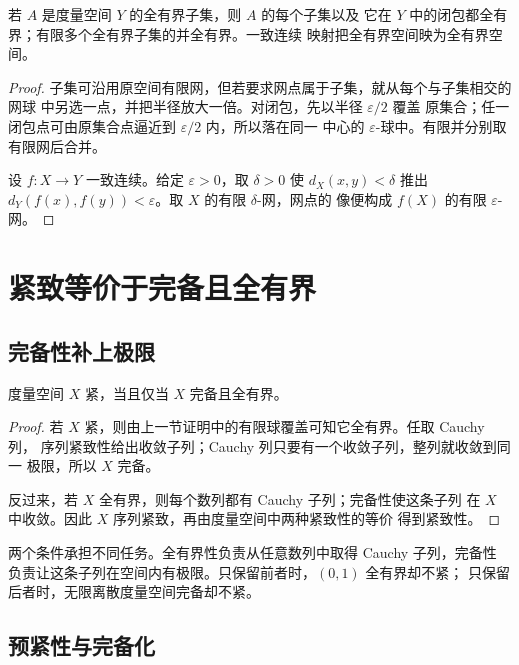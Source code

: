 \begin{proposition}[全有界性的保持]
\label{prop:total-bounded-preservation}
若 \(A\) 是度量空间 \(Y\) 的全有界子集，则 \(A\) 的每个子集以及
它在 \(Y\) 中的闭包都全有界；有限多个全有界子集的并全有界。一致连续
映射把全有界空间映为全有界空间。
\end{proposition}

\begin{proof}
子集可沿用原空间有限网，但若要求网点属于子集，就从每个与子集相交的网球
中另选一点，并把半径放大一倍。对闭包，先以半径 \(\varepsilon/2\) 覆盖
原集合；任一闭包点可由原集合点逼近到 \(\varepsilon/2\) 内，所以落在同一
中心的 \(\varepsilon\)-球中。有限并分别取有限网后合并。

设 \(f:X\to Y\) 一致连续。给定 \(\varepsilon>0\)，取 \(\delta>0\)
使 \(d_X(x,y)<\delta\) 推出
\(d_Y(f(x),f(y))<\varepsilon\)。取 \(X\) 的有限 \(\delta\)-网，网点的
像便构成 \(f(X)\) 的有限 \(\varepsilon\)-网。
\end{proof}

\section{紧致等价于完备且全有界}

\subsection{完备性补上极限}

\begin{theorem}[紧致度量空间的判据]
\label{thm:compact-iff-complete-totally-bounded}
度量空间 \(X\) 紧，当且仅当 \(X\) 完备且全有界。
\end{theorem}

\begin{proof}
若 \(X\) 紧，则由上一节证明中的有限球覆盖可知它全有界。任取 Cauchy 列，
序列紧致性给出收敛子列；Cauchy 列只要有一个收敛子列，整列就收敛到同一
极限，所以 \(X\) 完备。

反过来，若 \(X\) 全有界，则每个数列都有 Cauchy 子列；完备性使这条子列
在 \(X\) 中收敛。因此 \(X\) 序列紧致，再由度量空间中两种紧致性的等价
得到紧致性。
\end{proof}

两个条件承担不同任务。全有界性负责从任意数列中取得 Cauchy 子列，完备性
负责让这条子列在空间内有极限。只保留前者时，\((0,1)\) 全有界却不紧；
只保留后者时，无限离散度量空间完备却不紧。

\subsection{预紧性与完备化}

